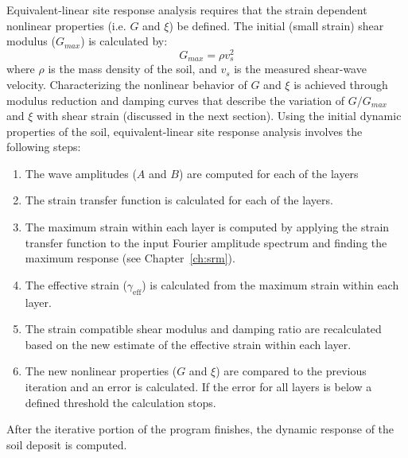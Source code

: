 \documentclass[11pt]{report}
\begin{document}
Equivalent-linear site response analysis requires that the strain dependent nonlinear properties
(i.e. $G$ and $\xi$) be defined.  The initial (small strain) shear modulus ($G_{max}$) is calculated by:
\begin{equation}
  G_{max} = \rho v_s ^ 2
\end{equation}
where $\rho$ is the mass density of the soil, and $v_s$ is the measured shear-wave velocity.
Characterizing the nonlinear behavior of $G$ and $\xi$ is achieved through modulus reduction and
damping curves that describe the variation of $G/G_{max}$ and $\xi$ with shear strain (discussed in
the next section).  Using the initial dynamic properties of the soil, equivalent-linear site
response analysis involves the following steps:
\begin{enumerate}
  \item The wave amplitudes ($A$ and $B$) are computed for each of the layers
  \item The strain transfer function is calculated for each of the layers.
  \item The maximum strain within each layer is computed by applying the strain transfer function
	to the input Fourier amplitude spectrum and finding the maximum response (see
	Chapter~\ref{ch:srm}).
  \item The effective strain ($\gamma_{\mathrm{eff}}$) is calculated from the maximum strain within
	each layer.
  \item The strain compatible shear modulus and damping ratio are recalculated based on the new
	  estimate of the effective strain within each layer.
  \item The new nonlinear properties ($G$ and $\xi$) are compared to the previous iteration and an
	error is calculated.  If the error for all layers is below a defined threshold the calculation
	stops.
\end{enumerate}
After the iterative portion of the program finishes, the dynamic response of the soil deposit is
computed.  
\end{document}
